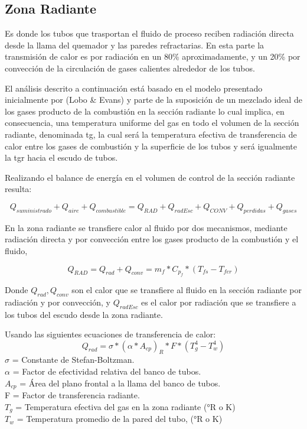 \subsection{Zona Radiante}
\par Es donde los tubos que trasportan el fluido de proceso reciben radiación directa desde la llama del quemador y las paredes refractarias. En esta parte la transmisión de calor es por radiación en un 80\% aproximadamente, y un 20\% por convección de la circulación de gases calientes alrededor de los tubos.

\par El análisis descrito a continuación está basado en el modelo presentado inicialmente por (Lobo \& Evans)\cite{bib:rad} y parte de la suposición de un mezclado ideal de los gases producto de la combustión en la sección radiante lo cual implica, en consecuencia, una temperatura uniforme del gas en todo el volumen de la sección radiante, denominada \ac{tg}, la cual será la temperatura efectiva de transferencia de calor entre los gases de combustión y la superficie de los tubos y será igualmente la \ac{tgr} hacia el escudo de tubos.

\par Realizando el balance de energía en el volumen de control de la sección radiante resulta:

\begin{equation}
    \label{eq:rad}
    Q_{suministrado} + Q_{aire} + Q_{combustible} = 
    Q_{RAD} + Q_{radEsc} + Q_{CONV} + Q_{perdidas} + Q_{gases}
\end{equation}

\par En la zona radiante se transfiere calor al fluido por dos mecanismos, mediante radiación directa y por convección entre los gases producto de la combustión y el fluido,

\begin{equation}
    \label{eq:rad-fluid}
    Q_{RAD} = Q_{rad} + Q_{conv} = m_f * C_{p_f} * (T_{fs} - T_{fer})
\end{equation}

\par Donde $Q_{rad}, Q_{conv}$ son el calor que se transfiere al fluido en la sección radiante por radiación y por convección, y $Q_{radEsc}$ es el calor por radiación que se transfiere a los tubos del escudo desde la zona radiante.

\par Usando las siguientes ecuaciones de transferencia de calor:
\begin{equation}
    Q_{rad} = \sigma * ( \alpha * A_{cp} )_{R} * F * ( T_{g}^{4} - T_{w}^{4} )
\end{equation}
$\sigma$ = Constante de Stefan-Boltzman.\\
$\alpha$ = Factor de efectividad relativa del banco de tubos.\\
$A_{cp}$ = Área del plano frontal a la llama del banco de tubos.\\
F = Factor de transferencia radiante.\\
$T_g$ = Temperatura efectiva del gas en la zona radiante (°R o K)\\
$T_w$ = Temperatura promedio de la pared del tubo, (°R o K)

